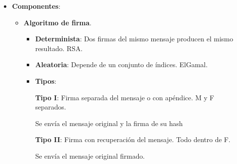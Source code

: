 \documentclass[12pt, twoside, openright]{report} %
\begin{document}
\begin{itemize}
\begin{itemize}
\begin{itemize}
		            \end{itemize}
		      \item \textbf{Componentes}:
		            \begin{itemize}
			            \item \textbf{Algoritmo de firma}.
			                  \begin{itemize}
				                  \item \textbf{Determinista}: Dos firmas del mismo mensaje producen el mismo resultado. RSA.
				                  \item \textbf{Aleatoria}: Depende de un conjunto de índices. ElGamal.
				                  \item \textbf{Tipos}:

				                        \textbf{Tipo I}: Firma separada del mensaje o con apéndice. M y F separados.

				                        Se envía el mensaje original y la firma de su hash

				                        \textbf{Tipo II}: Firma con recuperación del mensaje. Todo dentro de F.

				                        Se envía el mensaje original firmado.


\end{itemize}
\end{itemize}
\end{itemize}
\end{itemize}
\end{document}
